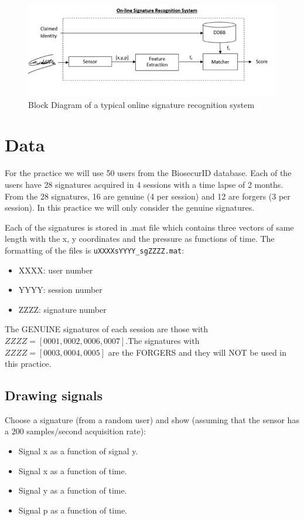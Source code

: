 \documentclass[a4paper]{article}
\def\inline{\lstinline[basicstyle=\ttfamily,keywordstyle={}]}
\begin{document}
\begin{figure}[H]
  \centering
  \includegraphics[scale=0.8]{Figures/Schema}
  
  \caption{Block Diagram of a typical online signature recognition system}
  \label{fig:intro}
\end{figure}

\section{Data}

For the practice we will use 50 users from the BiosecurID database. Each of the users have 28 signatures acquired in 4 sessions with a time lapse of 2 months. From the 28 signatures, 16 are genuine (4 per session) and 12 are forgers (3 per session). In this practice we will only consider the genuine signatures.

Each of the signatures is stored in .mat file which contains three vectors of same length with the x, y coordinates and the pressure as functions of time.
The formatting of the files is \inline{uXXXXsYYYY_sgZZZZ.mat}:

\begin{itemize}
\item XXXX: user number
\item	YYYY: session number
\item	ZZZZ: signature number
\end{itemize}

The GENUINE signatures of each session are those with \(ZZZZ=[0001,0002,0006,0007]\).The signatures with \(ZZZZ=[0003,0004,0005]\) are the FORGERS and they will NOT be used in this practice.


\subsection*{Drawing signals}
Choose a signature (from a random user) and show (assuming that the sensor has a \(200\) samples/second acquisition rate):
\begin{itemize}
\item	Signal x as a function of signal y.
\item	Signal x as a function of time.
\item	Signal y as a function of time.
\item	Signal p as a function of time.
\end{itemize}
\end{document}
